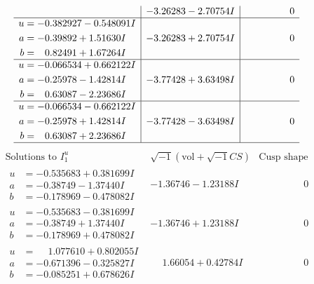 \documentclass[1p]{elsarticle_modified}
\theoremstyle{definition}
\newcommand{\I}{\sqrt{-1}}
\begin{document}
$$\begin{array}{c|c|c}
 & -3.26283 - 2.70754 I & \phantom{-0.000000 } 0 \\ \hline\begin{aligned}
u &= -0.382927 - 0.548091 I \\
a &= -0.39892 + 1.51630 I \\
b &= \phantom{-}0.82491 + 1.67264 I\end{aligned}
 & -3.26283 + 2.70754 I & \phantom{-0.000000 } 0 \\ \hline\begin{aligned}
u &= -0.066534 + 0.662122 I \\
a &= -0.25978 - 1.42814 I \\
b &= \phantom{-}0.63087 - 2.23686 I\end{aligned}
 & -3.77428 + 3.63498 I & \phantom{-0.000000 } 0 \\ \hline\begin{aligned}
u &= -0.066534 - 0.662122 I \\
a &= -0.25978 + 1.42814 I \\
b &= \phantom{-}0.63087 + 2.23686 I\end{aligned}
 & -3.77428 - 3.63498 I & \phantom{-0.000000 } 0\\
 \hline 
 \end{array}$$\newpage$$\begin{array}{c|c|c}  
\text{Solutions to }I^u_{1}& \I (\text{vol} + \sqrt{-1}CS) & \text{Cusp shape}\\
 \hline 
\begin{aligned}
u &= -0.535683 + 0.381699 I \\
a &= -0.38749 - 1.37440 I \\
b &= -0.178969 - 0.478082 I\end{aligned}
 & -1.36746 - 1.23188 I & \phantom{-0.000000 } 0 \\ \hline\begin{aligned}
u &= -0.535683 - 0.381699 I \\
a &= -0.38749 + 1.37440 I \\
b &= -0.178969 + 0.478082 I\end{aligned}
 & -1.36746 + 1.23188 I & \phantom{-0.000000 } 0 \\ \hline\begin{aligned}
u &= \phantom{-}1.077610 + 0.802055 I \\
a &= -0.671396 - 0.325827 I \\
b &= -0.085251 + 0.678626 I\end{aligned}
 & \phantom{-}1.66054 + 0.42784 I & \phantom{-0.000000 } 0 \\ \hline\begin{aligned}

\end{aligned}
\end{array}$$
\end{document}
